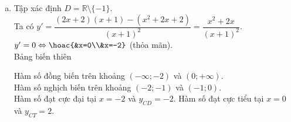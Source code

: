 \begin{bt}
{\begin{enumerate}[a) ]
			Ta có $y'=\dfrac{2(3x+1)-3(2x-1)}{(3x+1)^2}=\dfrac{5}{(3x+1)^2}>0$ với mọi $x$ khác $- \dfrac{1}{3}$. \\ 
			Vậy, hàm số $y=\dfrac{2x-1}{3x+1}$ đồng biến trên $\left(-\infty; - \dfrac{1}{3}\right)$ và $\left(- \dfrac{1}{3};+\infty\right)$.\\
			Hàm số không có cực trị.
			\item Tập xác định $D=\mathbb{R}\setminus \{-1\}$.\\
			Ta có $y'=\dfrac{(2x+2)(x+1)-(x^2+2x+2)}{(x+1)^2}=\dfrac{x^2+2x}{(x+1)^2}$. \\ 
			$y'=0\Leftrightarrow \hoac{&x=0\\&x=-2}$ (thỏa mãn). \\
			Bảng biến thiên 
			\begin{center}
			\end{center}
			Hàm số đồng biến trên khoảng $\left(-\infty;-2 \right)$ và $\left(0;+\infty \right)$. \\ 
			Hàm số nghịch biến trên khoảng $\left(-2;-1 \right)$ và $\left(-1;0 \right)$.\\
			Hàm số đạt cực đại tại $x=-2$ và $y_{CD}=-2$. Hàm số đạt cực tiểu tại $x=0$ và $y_{CT}=2$.
		\end{enumerate}
	}
\end{bt}

